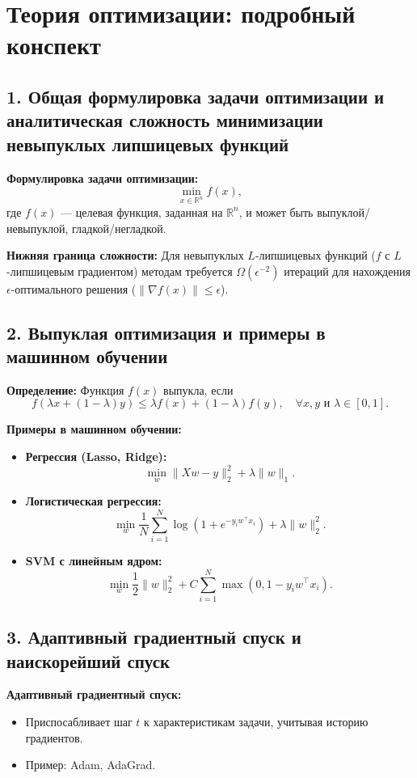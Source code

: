 \documentclass[a4paper,12pt]{article}
\begin{document}
\section*{Теория оптимизации: подробный конспект}

\subsection*{1. Общая формулировка задачи оптимизации и аналитическая сложность минимизации невыпуклых липшицевых функций}
\textbf{Формулировка задачи оптимизации:}
\[
\min_{x \in \mathbb{R}^n} f(x),
\]
где \(f(x)\) --- целевая функция, заданная на \(\mathbb{R}^n\), и может быть выпуклой/невыпуклой, гладкой/негладкой.

\textbf{Нижняя граница сложности:} Для невыпуклых \(L\)-липшицевых функций (\(f\) с \(L\)-липшицевым градиентом) методам требуется \(\Omega(\epsilon^{-2})\) итераций для нахождения \(\epsilon\)-оптимального решения (\(\|\nabla f(x)\| \leq \epsilon\)).

\subsection*{2. Выпуклая оптимизация и примеры в машинном обучении}
\textbf{Определение:} Функция \(f(x)\) выпукла, если
\[
f(\lambda x + (1 - \lambda)y) \leq \lambda f(x) + (1-\lambda)f(y), \quad \forall x, y \text{ и } \lambda \in [0, 1].
\]

\textbf{Примеры в машинном обучении:}
\begin{itemize}
    \item \textbf{Регрессия (Lasso, Ridge):}
    \[
    \min_w \|Xw - y\|_2^2 + \lambda \|w\|_1.
    \]
    \item \textbf{Логистическая регрессия:}
    \[
    \min_w \frac{1}{N} \sum_{i=1}^N \log(1 + e^{-y_i w^\top x_i}) + \lambda \|w\|_2^2.
    \]
    \item \textbf{SVM с линейным ядром:}
    \[
    \min_w \frac{1}{2}\|w\|_2^2 + C \sum_{i=1}^N \max(0, 1 - y_i w^\top x_i).
    \]
\end{itemize}

\subsection*{3. Адаптивный градиентный спуск и наискорейший спуск}
\textbf{Адаптивный градиентный спуск:}
\begin{itemize}
    \item Приспосабливает шаг \(t\) к характеристикам задачи, учитывая историю градиентов.
    \item Пример: Adam, AdaGrad.
\end{itemize}
\end{document}
